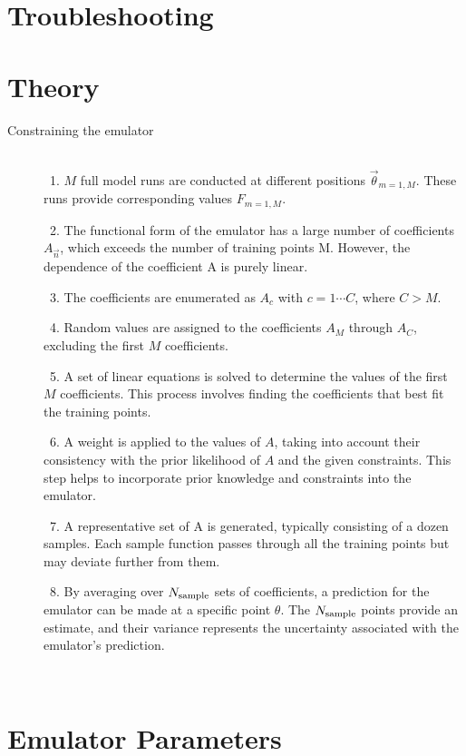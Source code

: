 \documentclass[12pt]{article}
\numberwithin{equation}{section}
\numberwithin{figure}{section}
\begin{document}
\section{Troubleshooting}


\section{Theory}

\begin{description}
\item[Constraining the emulator] \
\\
\ 1. $M$ full model runs are conducted at different positions $\vec{\theta}_{m=1,M}$. These runs provide corresponding values $F_{m=1,M}$. 

\ 2. The functional form of the emulator has a large number of coefficients $A_{\vec{n}}$, which exceeds the number of training points M. However, the dependence of the coefficient A is purely linear. 

\ 3. The coefficients are enumerated as $A_c$ with $c=1\cdots C$, where $C>M$.

\ 4. Random values are assigned to the coefficients $A_M$ through $A_C$, excluding the first $M$ coefficients. 

\ 5. A set of linear equations is solved to determine the values of the first $M$ coefficients. This process involves finding the coefficients that best fit the training points. 

\ 6. A weight is applied to the values of $A$, taking into account their consistency with the prior likelihood of $A$ and the given constraints. This step helps to incorporate prior knowledge and constraints into the emulator. 

\ 7. A representative set of A is generated, typically consisting of a dozen samples. Each sample function passes through all the training points but may deviate further from them. 

\ 8. By averaging over $N_{\rm sample}$ sets of coefficients, a prediction for the emulator can be made at a specific point $\theta$. The $N_{\rm sample}$ points provide an estimate, and their variance represents the uncertainty associated with the emulator's prediction. 

\end{description}\




\appendix


\section{Emulator Parameters}\label{sec:Emulator Parameter}
\end{document}
